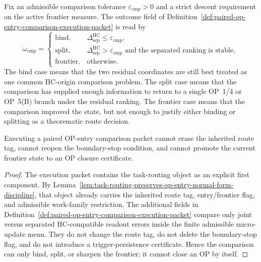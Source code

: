 \begin{definition}
\label{def:hc-origin-comparison-decision-rule}
Fix an admissible comparison tolerance $\varepsilon_{\mathrm{cmp}}>0$ and a strict descent requirement on the active frontier measure. The outcome field of Definition~\ref{def:paired-op-entry-comparison-execution-packet} is read by
\[
 \omega_{\mathrm{cmp}}
 =
 \begin{cases}
 \mathrm{bind},
 & \Delta_{\mathrm{sep}}^{\mathrm{HC}}\leq \varepsilon_{\mathrm{cmp}},\\[0.25em]
 \mathrm{split},
 & \Delta_{\mathrm{sep}}^{\mathrm{HC}}>\varepsilon_{\mathrm{cmp}}
 \text{ and the separated ranking is stable},\\[0.25em]
 \mathrm{frontier},
 & \text{otherwise.}
 \end{cases}
\]
The bind case means that the two residual coordinates are still best treated as one common HC-origin comparison problem. The split case means that the comparison has supplied enough information to return to a single OP~1/4 or OP~5(B) branch under the residual ranking. The frontier case means that the comparison improved the state, but not enough to justify either binding or splitting as a theorematic route decision.
\end{definition}

\begin{lemma}
\label{lem:paired-comparison-execution-preserves-handoff-discipline}
Executing a paired OP-entry comparison packet cannot erase the inherited route tag, cannot reopen the boundary-stop condition, and cannot promote the current frontier state to an OP closure certificate.
\end{lemma}

\begin{proof}
The execution packet contains the task-routing object as an explicit first component. By Lemma~\ref{lem:task-routing-preserves-op-entry-normal-form-discipline}, that object already carries the inherited route tag, entry/frontier flag, and admissible work-family restriction. The additional fields in Definition~\ref{def:paired-op-entry-comparison-execution-packet} compare only joint versus separated HC-compatible readout errors inside the finite admissible micro-update menu. They do not change the route tag, do not delete the boundary-stop flag, and do not introduce a trigger-persistence certificate. Hence the comparison can only bind, split, or sharpen the frontier; it cannot close an OP by itself.
\end{proof}

